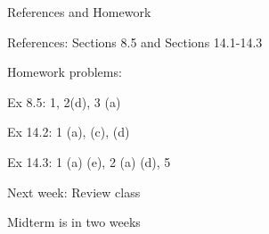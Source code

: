 \documentclass{./../../Latex/teaching_slides}
\begin{document}
\begin{frame}{References and Homework}
\begin{witemize}
  \item References: Sections 8.5 and Sections 14.1-14.3
  \item Homework problems: \\
  \begin{witemize}
    \normalsize
  	\item Ex 8.5: 1, 2(d), 3 (a)
  	\item Ex 14.2: 1 (a), (c), (d)
  	\item Ex 14.3: 1 (a) (e), 2 (a) (d), 5
  	\end{witemize}
 \item Next week: Review class
 \item Midterm is in two weeks 
  	\end{witemize}

\end{frame}
\end{document}
